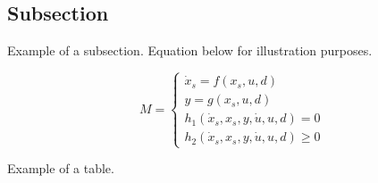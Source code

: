 
\subsection{Subsection}


Example of a subsection. Equation below for illustration purposes.


\begin{equation}
    M=\left\{\begin{array}{l}
        \dot{x}_{s}=f\left(x_{s}, u, d\right) \\
        y=g\left(x_{s}, u, d\right) \\
        h_{1}\left(\dot{x}_{s}, x_{s}, y, \dot{u}, u, d\right)=0 \\
        h_{2}\left(\dot{x}_{s}, x_{s}, y, \dot{u}, u, d\right) \geq 0
    \end{array}\right.
    \label{eq:eq1}
\end{equation}

Example of a table.


